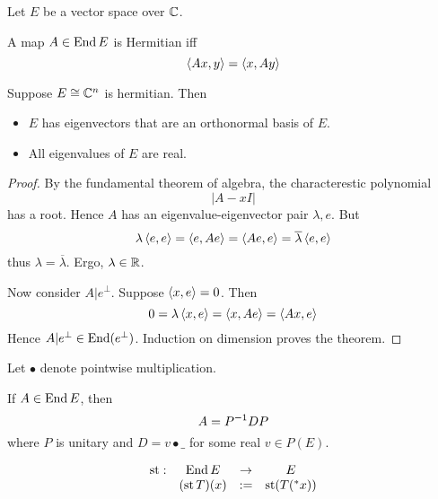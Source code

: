 \documentclass{scrartcl}
\newcommand{\conj}[1]{\overline{#1}}
\newcommand{\hyper}[1]{\prescript{*}{}{#1}}
\renewcommand{\define}{:=}
\DeclareMathOperator{\st}{st}
\begin{document}
  Let $E$ be a vector space over $\mathbb{C}$. 
\begin{defn}[Hermitian]
  A map $A\in \operatorname{End}{E}$ is Hermitian iff
  \[
    \left\langle Ax, y \right\rangle=\left\langle x, Ay \right\rangle
  \]
\end{defn}
\begin{theorem}
  \label{finite-spectral-theorem}
  Suppose $E\cong \mathbb{C}^n$ is hermitian. Then
  \begin{itemize}
  \item $E$ has eigenvectors that are an orthonormal basis of $E$.
  \item All eigenvalues of $E$ are real. 
  \end{itemize}

\end{theorem}
\begin{proof}
  \renewcommand{\vec}{}
  By the fundamental theorem of algebra, the characterestic polynomial
  \[
    |A-xI|
  \]
  has a root. Hence $A$ has an eigenvalue-eigenvector pair $\lambda, \vec e$. But
  \[
    \lambda \inner{\vec e}{\vec e}=\inner{\vec e}{A \vec e}=\inner{A\vec e}{\vec e}=\conj\lambda \inner{\vec e}{\vec e}
  \]
  thus $\lambda = \conj\lambda$. Ergo, $\lambda\in \mathbb{R}$. 

  Now consider $A|e^\perp$. Suppose $\left\langle x, e \right\rangle=0$. Then 
  \[
    0=\lambda\left\langle x, e \right\rangle=\left\langle x, Ae \right\rangle=\left\langle Ax, e \right\rangle
  \]
  Hence $A|e^\perp\in\operatorname{End}(e^\perp)$. Induction on dimension proves the theorem. 
\end{proof}

Let $\bullet$ denote pointwise multiplication. 
\begin{cor}[diagonalization]
  \label{thm:diag}
  If $A\in\operatorname{End} E$, then 
  \[
    A=P^{-1}DP\\
  \]
  where $P$ is unitary and $D = v\bullet\_$ for some real $v\in P(E)$.
\end{cor}

\begin{defn}
  \[
  \begin{matrix}
   \st: &\End E &\to &E \\
    &(\st T)(x) &\define& \st( T(\hyper x))
  \end{matrix}
  \]
\end{defn}
\end{document}
